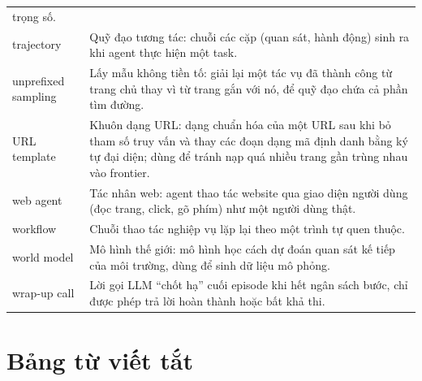 \begin{longtable}{L{4.2cm} L{9.8cm}}
trọng số. \\
trajectory & Quỹ đạo tương tác: chuỗi các cặp (quan sát, hành động) sinh ra
khi agent thực hiện một task. \\
unprefixed sampling & Lấy mẫu không tiền tố: giải lại một tác vụ đã thành công từ trang chủ thay vì từ trang gắn với nó, để quỹ đạo chứa cả phần tìm đường. \\
URL template & Khuôn dạng URL: dạng chuẩn hóa của một URL sau khi bỏ tham số
truy vấn và thay các đoạn dạng mã định danh bằng ký tự đại diện; dùng để
tránh nạp quá nhiều trang gần trùng nhau vào frontier. \\
web agent & Tác nhân web: agent thao tác website qua giao diện người dùng
(đọc trang, click, gõ phím) như một người dùng thật. \\
workflow & Chuỗi thao tác nghiệp vụ lặp lại theo một trình tự quen thuộc. \\
world model & Mô hình thế giới: mô hình học cách dự đoán quan sát kế tiếp
của môi trường, dùng để sinh dữ liệu mô phỏng. \\
wrap-up call & Lời gọi LLM ``chốt hạ'' cuối episode khi hết ngân sách bước,
chỉ được phép trả lời hoàn thành hoặc bất khả thi. \\
\bottomrule
\end{longtable}

\section*{Bảng từ viết tắt}

